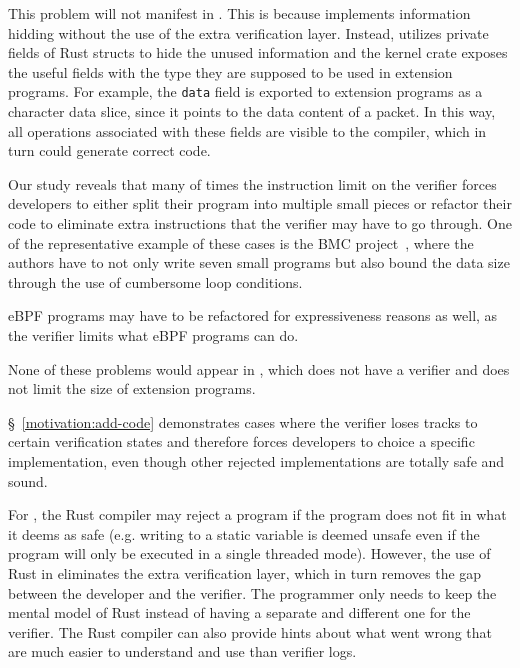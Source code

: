 This problem will not manifest in \projname{}.
This is because \projname{} implements information hidding without the use of
    the extra verification layer.
Instead, \projname{} utilizes private fields of Rust structs to hide the unused
    information and the kernel crate exposes the useful fields with the type
    they are supposed to be used in extension programs.
For example, the \texttt{data} field is exported to extension programs as a
    character data slice, since it points to the data content of a packet.
In this way, all operations associated with these fields are visible to the
    compiler, which in turn could generate correct code.

Our study reveals that many of times the instruction limit on the verifier
    forces developers to either split their program into multiple small pieces
    or refactor their code to eliminate extra instructions that the verifier
    may have to go through.
One of the representative example of these cases is the BMC project~\cite{BMC},
    where the authors have to not only write seven small programs but also
    bound the data size through the use of cumbersome loop conditions.

eBPF programs may have to be refactored for expressiveness reasons as well,
    as the verifier limits what eBPF programs can do.

None of these problems would appear in \projname{}, which does not
    have a verifier and does not limit the size of extension programs.


\S~\ref{motivation:add-code} demonstrates cases where the verifier loses tracks
    to certain verification states and therefore forces developers to
    choice a specific implementation, even though other rejected
    implementations are totally safe and sound.

For \projname{}, the Rust compiler may reject a program if the program does not
    fit in what it deems as safe (e.g. writing to a static variable is deemed
    unsafe even if the program will only be executed in a single threaded
    mode).
However, the use of Rust in \projname{} eliminates the extra verification layer,
    which in turn removes the gap between the developer and the verifier.
The programmer only needs to keep the mental model of Rust instead of having a
    separate and different one for the verifier.
The Rust compiler can also provide hints about what went wrong that are much 
    easier to understand and use than verifier logs.

